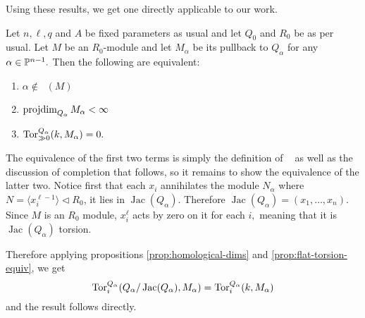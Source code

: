 \documentclass [11pt, proquest] {uwthesis}[2020/02/24]
\DeclareMathOperator{\supph}{supp^\mathit{hyp}}
\begin{document}
    Using these results, we get one directly applicable to our work.
    \begin{cor}\label{cor:hypersurfaces-tor}
        Let $n,\ell,q$ and $A$ be fixed parameters as usual and let $Q_0$ and $R_0$ be as per usual. Let $M$ be an $R_0$-module and let $M_\alpha$ be its pullback to $Q_\alpha$ for any $\alpha\in\mathbb{P}^{n-1}.$ Then the following are equivalent:
        \begin{enumerate}
            \item $\alpha\notin\supph(M)$
            \item $\operatorname{projdim}_{Q_\alpha} M_\alpha < \infty$
            \item $\operatorname{Tor}_{\gg 0}^{Q_\alpha}(k,M_\alpha)=0.$
        \end{enumerate}
    \end{cor}
    \begin{prf}
        The equivalence of the first two terms is simply the definition of $\supph$ as well as the discussion of completion that follows, so it remains to show the equivalence of the latter two. Notice first that each $x_i$ annihilates the module $N_\alpha$ where $N=\langle x_i^{\ell-1}\rangle\lhd R_0$, it lies in $\operatorname{Jac}(Q_\alpha)$. Therefore $\operatorname{Jac}(Q_\alpha)=(x_1,\dots,x_n).$ Since $M$ is an $R_0$ module, $x_i^\ell$ acts by zero on it for each $i,$ meaning that it is $\operatorname{Jac}(Q_\alpha)$ torsion. 
        
        Therefore applying propositions \ref{prop:homological-dims} and \ref{prop:flat-torsion-equiv}, we get
        \[\operatorname{Tor}_i^{Q_\alpha}(Q_\alpha/\operatorname{Jac}(Q_\alpha),M_\alpha)=\operatorname{Tor}_i^{Q_\alpha}(k,M_\alpha)\]
        and the result follows directly.
    \end{prf}
    
\end{document}
